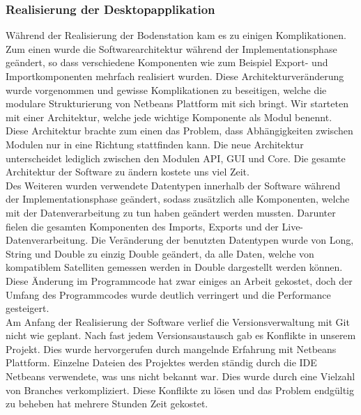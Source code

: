 \subsubsection{Realisierung der Desktopapplikation}
Während der Realisierung der Bodenstation kam es zu einigen Komplikationen. Zum einen wurde die Softwarearchitektur während der Implementationsphase geändert, so dass verschiedene Komponenten wie zum Beispiel Export- und Importkomponenten mehrfach realisiert wurden. Diese Architekturveränderung wurde vorgenommen und gewisse Komplikationen zu beseitigen, welche die modulare Strukturierung von Netbeans Plattform mit sich bringt. Wir starteten mit einer Architektur, welche jede wichtige Komponente als Modul benennt. Diese Architektur brachte zum einen das Problem, dass Abhängigkeiten zwischen Modulen nur in eine Richtung stattfinden kann. Die neue Architektur unterscheidet lediglich zwischen den Modulen API, GUI und Core. Die gesamte Architektur der Software zu ändern kostete uns viel Zeit.\\
Des Weiteren wurden verwendete Datentypen innerhalb der Software während der Implementationsphase geändert, sodass zusätzlich alle Komponenten, welche mit der Datenverarbeitung zu tun haben geändert werden mussten. Darunter fielen die gesamten Komponenten des Imports, Exports und der Live-Datenverarbeitung. Die Veränderung der benutzten Datentypen wurde von Long, String und Double zu einzig Double geändert, da alle Daten, welche von kompatiblem Satelliten gemessen werden in Double dargestellt werden können. Diese Änderung im Programmcode hat zwar einiges an Arbeit gekostet, doch der Umfang des Programmcodes wurde deutlich verringert und die Performance gesteigert.\\
Am Anfang der Realisierung der Software verlief die Versionsverwaltung mit Git nicht wie geplant. Nach fast jedem Versionsaustausch gab es Konflikte in unserem Projekt. Dies wurde hervorgerufen durch mangelnde Erfahrung mit Netbeans Plattform. Einzelne Dateien des Projektes werden ständig durch die IDE Netbeans verwendete, was uns nicht bekannt war. Dies wurde durch eine Vielzahl von Branches verkompliziert. Diese Konflikte zu lösen und das Problem endgültig zu beheben hat mehrere Stunden Zeit gekostet.